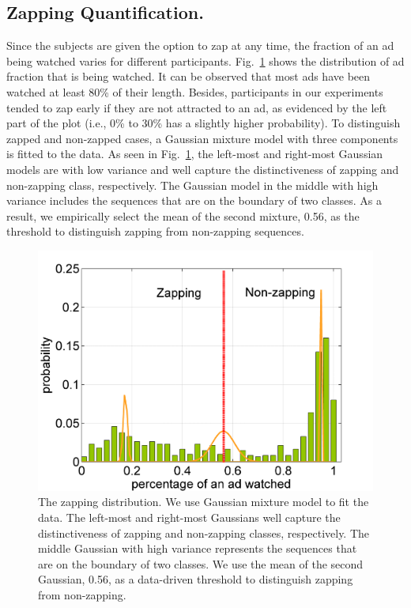 \documentclass[twoside,leqno,twocolumn]{article}
\begin{document}

\subsection{Zapping Quantification.}

Since the subjects are given the option to zap at any time, the fraction of an ad being watched varies for different participants. Fig.~\ref{fig:ad_len_distr} shows the distribution of ad fraction that is being watched. It can be observed that most ads have been watched at least 80\% of their length. Besides, participants in our experiments tended to zap early if they are not attracted to an ad, as evidenced by the left part of the plot (i.e., 0\% to 30\% has a slightly higher probability). To distinguish zapped and non-zapped cases, a Gaussian mixture model with three components is fitted to the data. As seen in Fig.~\ref{fig:ad_len_distr}, the left-most and right-most Gaussian models are with low variance and well capture the distinctiveness of zapping and non-zapping class, respectively. The Gaussian model in the middle with high variance includes the sequences that are on the boundary of two classes. As a result, we empirically select the mean of the second mixture, 0.56, as the threshold to distinguish zapping from non-zapping sequences.

\begin{figure}[h]
	\centering
		\includegraphics[width=.85\columnwidth]{fig/ad_len_distr.png}
	\caption{The zapping distribution. We use Gaussian mixture model to fit the data. The left-most and right-most Gaussians well capture the distinctiveness of zapping and non-zapping classes, respectively. The middle Gaussian with high variance represents the sequences that are on the boundary of two classes. We use the mean of the second Gaussian, 0.56, as a data-driven threshold to distinguish zapping from non-zapping.}
	\label{fig:ad_len_distr}
\end{figure}
\end{document}
